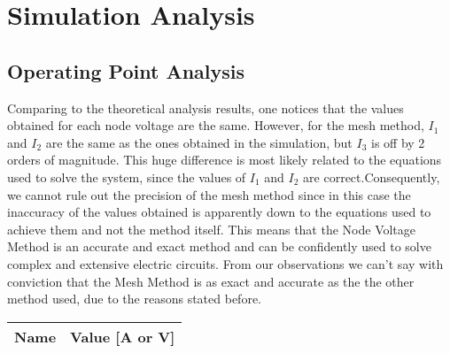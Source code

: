 \section{Simulation Analysis}
\label{sec:simulation}

\subsection{Operating Point Analysis}



\par Comparing to the theoretical analysis results, one notices that the values obtained for each node voltage are the same. However, for the mesh method, $I_1$ and $I_2$ are the same as the ones obtained in the simulation, but $I_3$ is off by 2 orders of magnitude. This huge difference is most likely related to the equations used to solve the system, since the values of $I_1$ and $I_2$ are correct.Consequently, we cannot rule out the precision of the mesh method since in this case the inaccuracy of the values obtained is apparently down to the equations used to achieve them and not the method itself. This means that the Node Voltage Method is an accurate and exact method and can be confidently used to solve complex and extensive electric circuits. From our observations we can't say with conviction that the Mesh Method is as exact and accurate as the the other method used, due to the reasons stated before. 

\begin{table}[h]
  \centering
  \begin{tabular}{|l|r|}
    \hline    
    {\bf Name} & {\bf Value [A or V]} \\ \hline
    
  \end{tabular}
  \label{tab:op}
\end{table}











